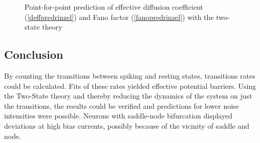 \documentclass[12pt,a4paper]{article}
\begin{document}
\begin{figure}[H]
	\hspace*{-0.5cm}
	\caption{Point-for-point prediction of effective diffusion coefficient (\ref{deffpredrinzel}) and Fano factor (\ref{fanopredrinzel}) with the two-state theory}
\end{figure}
\subsection{Conclusion}
By counting the transitions between spiking and resting states, transitions rates could be calculated. Fits of these rates yielded effective potential barriers. Using the Two-State theory and thereby reducing the dynamics of the system on just the transitions, the results could be verified and predictions for lower noise intensities were possible. Neurons with saddle-node bifurcation displayed deviations at high bias currents, possibly because of the vicinity of saddle and node.  
\newpage
\end{document}
